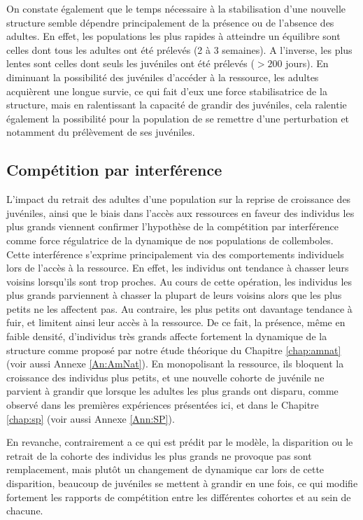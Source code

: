On constate également que le temps nécessaire à la stabilisation d'une nouvelle
structure semble dépendre principalement de la présence ou de l'absence des
adultes. En effet, les populations les plus rapides à atteindre un équilibre
sont celles dont tous les adultes ont été prélevés (2 à 3 semaines).
A l'inverse, les plus lentes sont celles dont seuls les juvéniles ont été
prélevés ($>200$ jours). En diminuant la possibilité des juvéniles d'accéder à
la ressource, les adultes acquièrent une longue survie, ce qui fait d'eux une
force stabilisatrice de la structure, mais en ralentissant la capacité de
grandir des juvéniles, cela ralentie également la possibilité pour la population
de se remettre d'une perturbation et notamment du prélèvement de ses juvéniles.

\subsection{Compétition par interférence}

L'impact du retrait des adultes d'une population sur la reprise de croissance
des juvéniles, ainsi que le biais dans l'accès aux ressources en faveur des
individus les plus grands viennent confirmer l'hypothèse de la compétition par
interférence comme force régulatrice de la dynamique de nos populations de
collemboles. Cette interférence s'exprime principalement via des comportements
individuels lors de l'accès à la ressource. En effet, les individus ont tendance
à chasser leurs voisins lorsqu'ils sont trop proches. Au cours de cette
opération, les individus les plus grands parviennent à chasser la plupart de
leurs voisins alors que les plus petits ne les affectent pas. Au contraire, les plus petits
ont davantage tendance à fuir, et limitent ainsi leur accès à la ressource. De
ce fait, la présence, même en faible densité, d'individus très grands affecte
fortement la dynamique de la structure comme proposé par notre étude théorique
du Chapitre \ref{chap:amnat} (voir aussi Annexe \ref{An:AmNat}). En monopolisant
la ressource, ils bloquent la croissance des individus plus petits, et une nouvelle cohorte de juvénile ne
parvient à grandir que lorsque les adultes les plus grands ont disparu, comme
observé dans les premières expériences présentées ici, et dans le Chapitre
\ref{chap:sp} (voir aussi Annexe \ref{Ann:SP}).

En revanche, contrairement a ce qui est prédit par le modèle, la disparition
ou le retrait de la cohorte des individus les plus grands ne provoque pas sont
remplacement, mais plutôt un changement de dynamique car lors de cette
disparition, beaucoup de juvéniles se mettent à grandir en une fois, ce qui
modifie fortement les rapports de compétition entre les différentes cohortes et
au sein de chacune.

